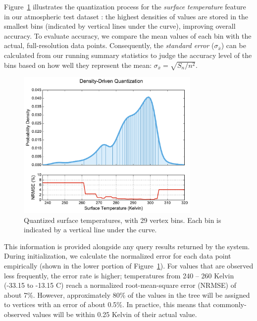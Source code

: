 \documentclass[9pt,journal,compsoc]{IEEEtran}
\begin{document}
Figure~\ref{fig:quantization} illustrates the quantization process for the \emph{surface temperature} feature in our atmospheric test dataset \cite{noaa_nam}: the highest densities of values are stored in the smallest bins (indicated by vertical lines under the curve), improving overall accuracy. To evaluate accuracy, we compare the mean values of each bin with the actual, full-resolution data points. Consequently, the \emph{standard error} ($\sigma_{\bar{x}}$) can be calculated from our running summary statistics to judge the accuracy level of the bins based on how well they represent the mean: $ \sigma_{\bar{x}} = \sqrt{{S_n}/{n^2}} $.
%
\begin{figure}[b!]
    \centerline{\includegraphics[width=3.5in]{figures/quantization.pdf}}
    \caption{Quantized surface temperatures, with 29 vertex bins. Each bin is indicated by a vertical line under the curve.}
    \label{fig:quantization}
\end{figure}
%
This information is provided alongside any query results returned by the system. During initialization, we calculate the normalized error for each data point empirically (shown in the lower portion of Figure~\ref{fig:quantization}). For values that are observed less frequently, the error rate is higher; temperatures from 240 -- 260 Kelvin (-33.15 to -13.15 \degree C) reach a normalized root-mean-square error (NRMSE) of about 7\%. However, approximately 80\% of the values in the tree will be assigned to vertices with an error of about 0.5\%. In practice, this means that commonly-observed values will be within 0.25 Kelvin of their actual value.
\end{document}
